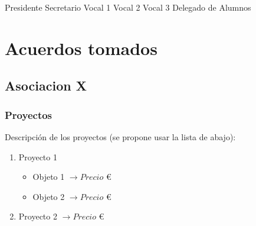 \documentclass[12pt, a4paper, spanish]{article}
\begin{document}
    \quad
    
    \quad
    
    \quad
    
    \quad

    \quad
    
    \quad

    \quad
    
    \quad

    \quad
    
    \quad

    \quad

    \begin{flushleft}
        Presidente \quad \quad Secretario \quad \quad Vocal 1 \quad \quad Vocal 2 \quad \quad Vocal 3 \quad \quad Delegado de Alumnos
        \begin{figure}[H]
        \end{figure}
    \end{flushleft}

    \newpage
    \section{Acuerdos tomados}
    \subsection{Asociacion X}
    \subsubsection{Proyectos}
    Descripción de los proyectos (se propone usar la lista de abajo):
        \begin{enumerate}
            \item Proyecto 1
                \begin{itemize}
                    \item Objeto 1 $\rightarrow Precio$ \euro{}
                    \item Objeto 2 $\rightarrow Precio$ \euro{}
                \end{itemize}
            
            \item Proyecto 2 $\rightarrow Precio$ \euro{}
            
        \end{enumerate}
\end{document}
